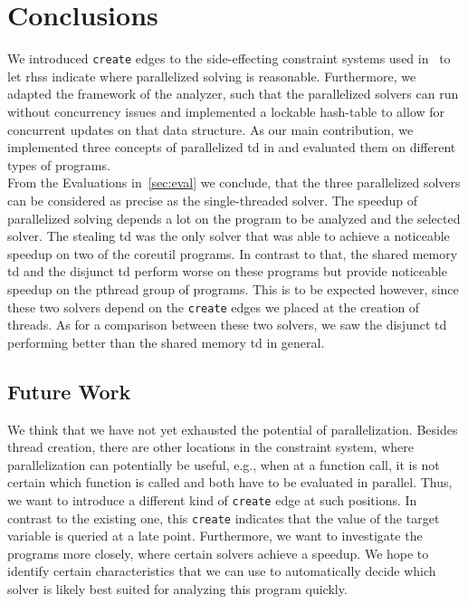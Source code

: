 \section{Conclusions}
\label{sec:conclusions}
We introduced \texttt{create} edges to the side-effecting constraint systems used in \gob\ to let \acp{rhs} indicate where parallelized solving is reasonable. Furthermore, we adapted the framework of the analyzer, such that the parallelized solvers can run without concurrency issues and implemented a lockable hash-table to allow for concurrent updates on that data structure. As our main contribution, we implemented three concepts of parallelized \acl{td} in \gob and evaluated them on different types of programs.\\
From the Evaluations in~\autoref{sec:eval} we conclude, that the three parallelized solvers can be considered as precise as the single-threaded solver. The speedup of parallelized solving depends a lot on the program to be analyzed and the selected solver. The stealing \ac{td} was the only solver that was able to achieve a noticeable speedup on two of the coreutil programs. In contrast to that, the shared memory \ac{td} and the disjunct \ac{td} perform worse on these programs but provide noticeable speedup on the pthread group of programs. This is to be expected however, since these two solvers depend on the \texttt{create} edges we placed at the creation of threads. As for a comparison between these two solvers, we saw the disjunct \ac{td} performing better than the shared memory \ac{td} in general.

  \label{sec:conclusions:futureWork} 
  \subsection{Future Work}
  We think that we have not yet exhausted the potential of parallelization. Besides thread creation, there are other locations in the constraint system, where parallelization can potentially be useful, e.g., when at a function call, it is not certain which function is called and both have to be evaluated in parallel. Thus, we want to introduce a different kind of \texttt{create} edge at such positions. In contrast to the existing one, this \texttt{create} indicates that the value of the target variable is queried at a late point.
  Furthermore, we want to investigate the programs more closely, where certain solvers achieve a speedup. We hope to identify certain characteristics that we can use to automatically decide which solver is likely best suited for analyzing this program quickly.